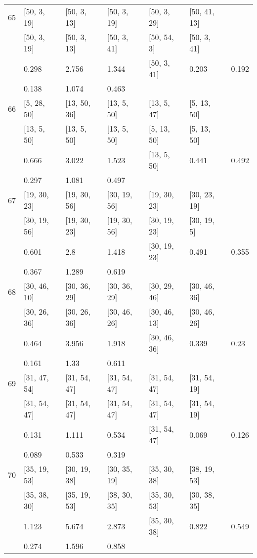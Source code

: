 \begin{longtable}{| l || l | l | l | l | l | l | }
\hline
65  & [50, 3, 19] & [50, 3, 13] & [50, 3, 19] & [50, 3, 29] & [50, 41, 13] \\
 & [50, 3, 19] & [50, 3, 13] & [50, 3, 41] & [50, 54, 3] & [50, 3, 41]\\
\hline
& 0.298 & 2.756 & 1.344 & [50, 3, 41] & 0.203 & 0.192\\
\hline
& 0.138 & 1.074 & 0.463 \\
\hline

\hline
66  & [5, 28, 50] & [13, 50, 36] & [13, 5, 50] & [13, 5, 47] & [5, 13, 50] \\
 & [13, 5, 50] & [13, 5, 50] & [13, 5, 50] & [5, 13, 50] & [5, 13, 50]\\
\hline
& 0.666 & 3.022 & 1.523 & [13, 5, 50] & 0.441 & 0.492\\
\hline
& 0.297 & 1.081 & 0.497 \\
\hline

\hline
67  & [19, 30, 23] & [19, 30, 56] & [30, 19, 56] & [19, 30, 23] & [30, 23, 19] \\
 & [30, 19, 56] & [19, 30, 23] & [19, 30, 56] & [30, 19, 23] & [30, 19, 5]\\
\hline
& 0.601 & 2.8 & 1.418 & [30, 19, 23] & 0.491 & 0.355\\
\hline
& 0.367 & 1.289 & 0.619 \\
\hline

\hline
68  & [30, 46, 10] & [30, 36, 29] & [30, 36, 29] & [30, 29, 46] & [30, 46, 36] \\
 & [30, 26, 36] & [30, 26, 36] & [30, 46, 26] & [30, 46, 13] & [30, 46, 26]\\
\hline
& 0.464 & 3.956 & 1.918 & [30, 46, 36] & 0.339 & 0.23\\
\hline
& 0.161 & 1.33 & 0.611 \\
\hline

\hline
69  & [31, 47, 54] & [31, 54, 47] & [31, 54, 47] & [31, 54, 47] & [31, 54, 19] \\
 & [31, 54, 47] & [31, 54, 47] & [31, 54, 47] & [31, 54, 47] & [31, 54, 19]\\
\hline
& 0.131 & 1.111 & 0.534 & [31, 54, 47] & 0.069 & 0.126\\
\hline
& 0.089 & 0.533 & 0.319 \\
\hline

\hline
70  & [35, 19, 53] & [30, 19, 38] & [30, 35, 19] & [35, 30, 38] & [38, 19, 53] \\
 & [35, 38, 30] & [35, 19, 53] & [38, 30, 35] & [35, 30, 53] & [30, 38, 35]\\
\hline
& 1.123 & 5.674 & 2.873 & [35, 30, 38] & 0.822 & 0.549\\
\hline
& 0.274 & 1.596 & 0.858 \\
\hline


\end{longtable}

